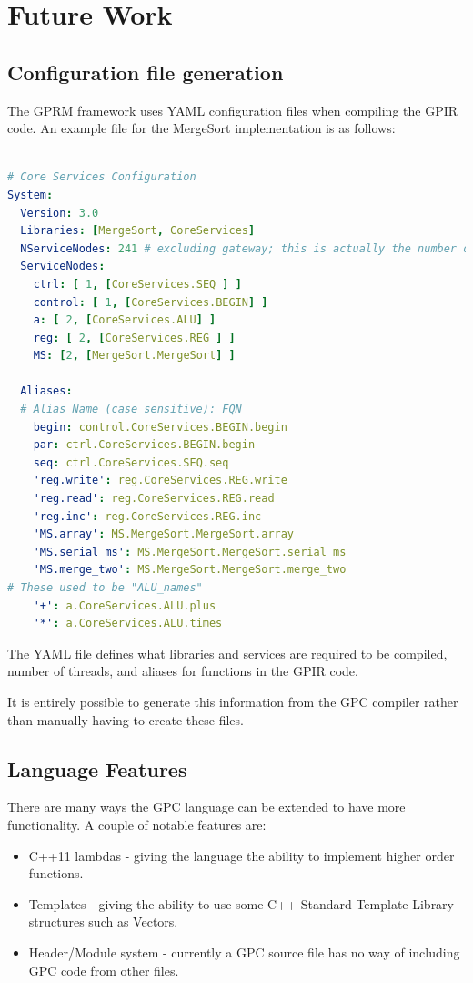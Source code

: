\chapter{Future Work}
\label{ch:future}

\section{Configuration file generation}

The GPRM framework uses YAML configuration files\cite{yaml} when compiling the GPIR code.
An example file for the MergeSort implementation is as follows:

\begin{lstlisting}[language=yaml]

# Core Services Configuration
System:
  Version: 3.0
  Libraries: [MergeSort, CoreServices]
  NServiceNodes: 241 # excluding gateway; this is actually the number of threads
  ServiceNodes:
    ctrl: [ 1, [CoreServices.SEQ ] ]
    control: [ 1, [CoreServices.BEGIN] ]
    a: [ 2, [CoreServices.ALU] ]
    reg: [ 2, [CoreServices.REG ] ]
    MS: [2, [MergeSort.MergeSort] ]

  Aliases:
  # Alias Name (case sensitive): FQN
    begin: control.CoreServices.BEGIN.begin
    par: ctrl.CoreServices.BEGIN.begin
    seq: ctrl.CoreServices.SEQ.seq
    'reg.write': reg.CoreServices.REG.write
    'reg.read': reg.CoreServices.REG.read
    'reg.inc': reg.CoreServices.REG.inc
    'MS.array': MS.MergeSort.MergeSort.array
    'MS.serial_ms': MS.MergeSort.MergeSort.serial_ms
    'MS.merge_two': MS.MergeSort.MergeSort.merge_two
# These used to be "ALU_names"  
    '+': a.CoreServices.ALU.plus
    '*': a.CoreServices.ALU.times
\end{lstlisting}

The YAML file defines what libraries and services are required to be compiled,
number of threads, and aliases for functions in the GPIR code.

It is entirely possible to generate this information from the GPC compiler rather
than manually having to create these files.


\section{Language Features}
    There are many ways the GPC language can be extended to have more
    functionality. A couple of notable features are:
    \begin{itemize}
        \item C++11 lambdas - giving the language the ability to implement higher order functions.
        \item Templates - giving the ability to use some C++ Standard Template Library structures such as Vectors.
        \item Header/Module system - currently a GPC source file has no way of including GPC code
    from other files.

    \end{itemize} 

